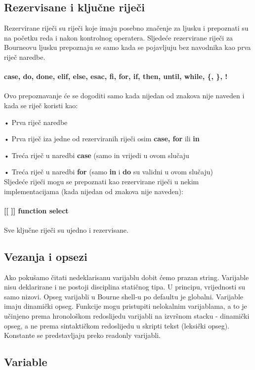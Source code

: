 \documentclass[11pt]{book}
\begin{document}
\subsection{Rezervisane i ključne riječi}
Rezervirane riječi su riječi koje imaju posebno značenje za ljusku i prepoznati su na početku reda i nakon kontrolnog operatera. Sljedeće rezervirane riječi za Bourneovu ljusku prepoznaju se samo kada se pojavljuju bez navodnika kao prva riječ naredbe.\\\\
\textbf{ case, do, done, elif, else, esac, fi, for, if, then, until, while, \{, \}, !}\\\\
Ovo prepoznavanje će se dogoditi samo kada nijedan od znakova nije naveden i kada se riječ koristi kao: 

•	Prva riječ naredbe 

•	Prva riječ iza jedne od rezerviranih riječi osim \textbf{case, for} ili \textbf{in} 

•	Treća riječ u naredbi \textbf{case} (samo in vrijedi u ovom slučaju  

•	Treća riječ u naredbi \textbf{for} (samo \textbf{in} i \textbf{do} su validni u ovom slučaju)\\

Sljedeće riječi mogu se prepoznati kao rezervirane riječi u nekim implementacijama (kada nijedan od znakova nije naveden):\\\\
\textbf{[[ ]] function select}\\\\
Sve ključne riječi su ujedno i rezervisane.

\subsection{Vezanja i opsezi}

Ako pokušamo čitati nedeklarisanu varijablu dobit ćemo prazan string. 
Varijable nisu deklarirane i ne postoji disciplina statičnog tipa. U principu, vrijednosti su samo nizovi.
Opseg varijabli u Bourne shell‐u po defaultu je globalni. Varijable imaju dinamički opseg.
Funkcije mogu pristupiti nelokalnim varijablama, a to je učinjeno prema hronološkom redoslijedu varijabli na izvršnom stacku - dinamički opseg, a ne prema sintaktičkom redoslijedu u skripti tekst (leksički opseg).
Konstante se predstavljaju preko readonly varijabli.

\subsection{Variable}
\end{document}
